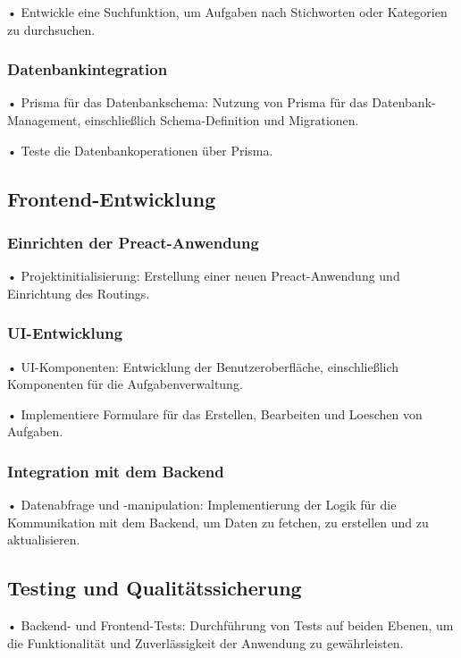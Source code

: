 \documentclass[12pt,a4paper]{article} %
\begin{document}
•	Entwickle eine Suchfunktion, um Aufgaben nach Stichworten oder Kategorien zu durchsuchen.

\subsubsection*{Datenbankintegration}

•	Prisma für das Datenbankschema: Nutzung von Prisma für das Datenbank-Management, einschließlich Schema-Definition und Migrationen.

•	Teste die Datenbankoperationen über Prisma.

\subsection{Frontend-Entwicklung}

\subsubsection*{Einrichten der Preact-Anwendung}

•	Projektinitialisierung: Erstellung einer neuen Preact-Anwendung und Einrichtung des Routings.

\subsubsection*{UI-Entwicklung}

•	UI-Komponenten: Entwicklung der Benutzeroberfläche, einschließlich Komponenten für die Aufgabenverwaltung.

•	Implementiere Formulare für das Erstellen, Bearbeiten und Loeschen von Aufgaben.

\subsubsection*{Integration mit dem Backend}

•	Datenabfrage und -manipulation: Implementierung der Logik für die Kommunikation mit dem Backend, um Daten zu fetchen, zu erstellen und zu aktualisieren.

\subsection{Testing und Qualitätssicherung}

•	Backend- und Frontend-Tests: Durchführung von Tests auf beiden Ebenen, um die Funktionalität und Zuverlässigkeit der Anwendung zu gewährleisten.
\end{document}
